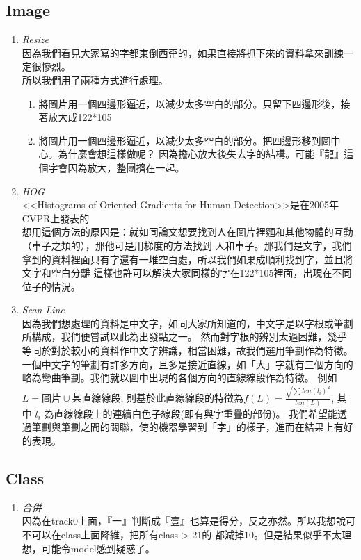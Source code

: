\documentclass[12pt]{article}
\theoremstyle{definition}
\theoremstyle{remark}
\begin{document}
\subsection{Image}
\begin{enumerate}
  \item \large{\em \color{red}Resize\/}\\
    因為我們看見大家寫的字都東倒西歪的，如果直接將抓下來的資料拿來訓練一定很慘烈。\\
    所以我們用了兩種方式進行處理。
    \begin{enumerate}
      \item 將圖片用一個四邊形逼近，以減少太多空白的部分。只留下四邊形後，接著放大成122*105
      \item 將圖片用一個四邊形逼近，以減少太多空白的部分。把四邊形移到圖中心。為什麼會想這樣做呢？
        因為擔心放大後失去字的結構。可能『龍』這個字會因為放大，整團擠在一起。
    \end{enumerate}
  \item \large{\em \color{red}HOG\/}\\
    <<Histograms of Oriented Gradients for Human Detection>>是在2005年CVPR上發表的\\
    想用這個方法的原因是：就如同論文想要找到人在圖片裡麵和其他物體的互動（車子之類的），那他可是用梯度的方法找到
    人和車子。那我們是文字，我們拿到的資料裡面只有字還有一堆空白處，所以我們如果成順利找到字，並且將文字和空白分離
    這樣也許可以解決大家同樣的字在122*105裡面，出現在不同位子的情況。
  \item \large{\em \color{red}Scan Line\/}\\
    因為我們想處理的資料是中文字，如同大家所知道的，中文字是以字根或筆劃所構成，我們便嘗試以此為出發點之一。
    然而對字根的辨別太過困難，幾乎等同於對於較小的資料作中文字辨識，相當困難，故我們選用筆劃作為特徵。
    一個中文字的筆劃有許多方向，且多是接近直線，如「大」字就有三個方向的略為彎曲筆劃。我們就以圖中出現的各個方向的直線線段作為特徵。
    例如 $L = \text{圖片} \cup \text{某直線線段}$, 則基於此直線線段的特徵為$f(L) = \frac{\sqrt{\sum len(l_i)^2}}{len(L)}$, 其中 $l_i$ 為直線線段上的連續白色子線段(即有與字重疊的部份)。
    我們希望能透過筆劃與筆劃之間的關聯，使的機器學習到「字」的樣子，進而在結果上有好的表現。
\end{enumerate}
\subsection{Class}
\begin{enumerate}
  \item \large{\em \color{red}合併\/}\\
  因為在track0上面，『一』判斷成『壹』也算是得分，反之亦然。所以我想說可不可以在class上面降維，把所有class > 21的
    都減掉10。但是結果似乎不太理想，可能令model感到疑惑了。
\end{enumerate}
\end{document}
